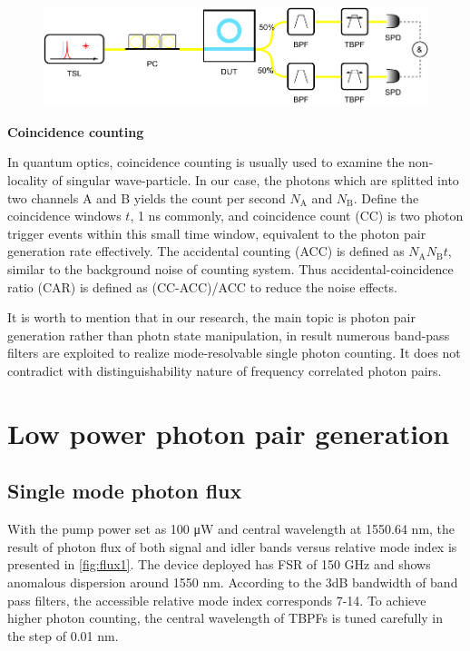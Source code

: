 \begin{figure}
	\centering
	\includegraphics[width=1\linewidth]{imgs/biBPF.pdf}
%	
	\label{fig:bibpf}
\end{figure}

\bigskip
\textbf{Coincidence counting}

In quantum optics, coincidence counting is usually used to examine the non-locality of singular wave-particle. In our case, the photons which are splitted into two channels A and B yields the count per second $N_\mathrm{A}$ and $ N_\mathrm{B} $. Define the coincidence windows $t$, 1 ns commonly, and coincidence count (CC) is two photon trigger events within this small time window, equivalent to the photon pair generation rate effectively. The accidental counting (ACC) is defined as $ N_\mathrm{A} N_\mathrm{B} t $, similar to the background noise of counting system. Thus accidental-coincidence ratio (CAR) is defined as (CC-ACC)/ACC to reduce the noise effects.

It is worth to mention that in our research, the main topic is photon pair generation rather than photn state manipulation, in result numerous band-pass filters are exploited to realize mode-resolvable single photon counting. It does not contradict with distinguishability nature of frequency correlated photon pairs.


\section{Low power photon pair generation}

\subsection{Single mode photon flux}

With the pump power set as 100 \si{\micro\watt} and central wavelength at 1550.64 nm, the result of photon flux of both signal and idler bands versus relative mode index is presented in \autoref{fig:flux1}. The device deployed has FSR of 150 GHz and shows anomalous dispersion around 1550 nm. According to the 3dB bandwidth of band pass filters, the accessible relative mode index corresponds 7-14. To achieve higher photon counting, the central wavelength of TBPFs is tuned carefully in the step of 0.01 nm.

